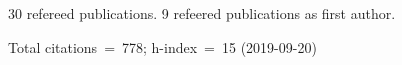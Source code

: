 30 refereed publications. 9 refeered publications as first author.

Total citations~=~778; h-index~=~15 (2019-09-20)